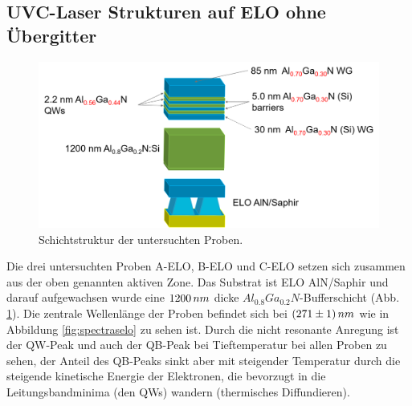 \subsection{UVC-Laser Strukturen auf ELO ohne Übergitter}
%
\begin{figure}[h]
\includegraphics[width=\linewidth]{Bilder/TS4045/ts4045.png}
\caption{Schichtstruktur der untersuchten Proben.}
\label{fig:schichtenelo}
\end{figure}
\noindent 
%
Die drei untersuchten Proben A-ELO, B-ELO und C-ELO setzen sich zusammen aus der oben genannten aktiven Zone. Das Substrat ist ELO AlN/Saphir und darauf aufgewachsen wurde eine $1200 \thinspace nm$ dicke $ Al_{0.8}Ga_{0.2}N$-Bufferschicht (Abb. \ref{fig:schichtenelo}). Die zentrale Wellenlänge der Proben befindet sich bei $(271 \pm 1) \thinspace nm$ wie in Abbildung \ref{fig:spectraselo} zu sehen ist. Durch die nicht resonante Anregung ist der QW-Peak und auch der QB-Peak bei Tieftemperatur bei allen Proben zu sehen, der Anteil des QB-Peaks sinkt aber mit steigender Temperatur durch die steigende kinetische Energie der Elektronen, die bevorzugt in die Leitungsbandminima (den QWs) wandern (thermisches Diffundieren).
%
